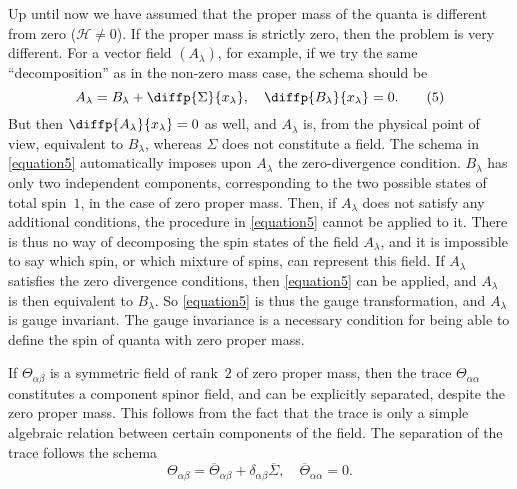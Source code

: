 \documentclass{article}
\newcommand{\HH}{\mathscr{H}}
\begin{document}
Up until now we have assumed that the proper mass of the quanta is different from zero ($\HH\neq0$).
If the proper mass is strictly zero, then the problem is very different.
For a vector field $(A_\lambda)$, for example, if we try the same ``decomposition'' as in the non-zero mass case, the schema should be
\[
\label{equation5}
  A_\lambda = B_\lambda + \diffp{\Sigma}{{x_\lambda}},
  \quad
  \diffp{{B_\lambda}}{{x_\lambda}} = 0.
  \tag{5}
\]
But then $\diffp{{A_\lambda}}{{x_\lambda}}=0$ as well, and $A_\lambda$ is, from the physical point of view, equivalent to $B_\lambda$, whereas $\Sigma$ does not constitute a field.
The schema in \cref{equation5} automatically imposes upon $A_\lambda$ the zero-divergence condition.
$B_\lambda$ has only two independent components, corresponding to the two possible states of total spin~$1$, in the case of zero proper mass.
Then, if $A_\lambda$ does not satisfy any additional conditions, the procedure in \cref{equation5} cannot be applied to it.
There is thus no way of decomposing the spin states of the field $A_\lambda$, and it is impossible to say which spin, or which mixture of spins, can represent this field.
If $A_\lambda$ satisfies the zero divergence conditions, then \cref{equation5} can be applied, and $A_\lambda$ is then equivalent to $B_\lambda$.
So \cref{equation5} is thus the gauge transformation, and $A_\lambda$ is gauge invariant.
The gauge invariance is a necessary condition for being able to define the spin of quanta with zero proper mass.

If $\Theta_{\alpha\beta}$ is a symmetric field of rank~$2$ of zero proper mass, then the trace $\Theta_{\alpha\alpha}$ constitutes a component spinor field, and can be explicitly separated, despite the zero proper mass.
This follows from the fact that the trace is only a simple algebraic relation between certain components of the field.
The separation of the trace follows the schema
\[
\label{equation6}
  \Theta_{\alpha\beta} = \overline{\Theta}_{\alpha\beta} + \delta_{\alpha\beta}\overline{\Sigma},
  \quad
  \overline{\Theta}_{\alpha\alpha} = 0.
  \tag{6}
\]
\end{document}
